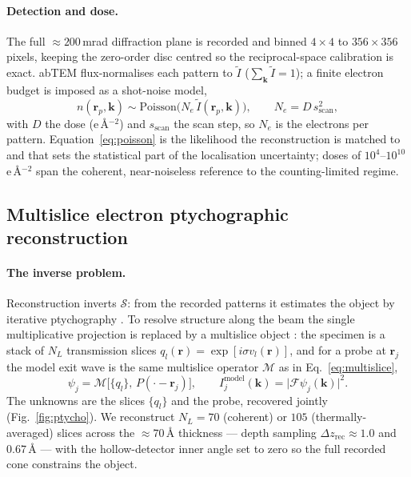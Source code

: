 \paragraph{Detection and dose.}
The full $\approx200$\,mrad diffraction plane is recorded and binned $4\times4$ to
$356\times356$ pixels, keeping the zero-order disc centred so the reciprocal-space calibration
is exact. abTEM flux-normalises each pattern to $\tilde I$ ($\sum_{\mathbf{k}}\tilde I=1$); a
finite electron budget is imposed as a shot-noise model,
\begin{equation}
  n(\mathbf{r}_p,\mathbf{k}) \sim \mathrm{Poisson}\!\big(N_e\,\tilde I(\mathbf{r}_p,\mathbf{k})\big),
  \qquad N_e = D\,s_{\mathrm{scan}}^2,
  \label{eq:poisson}
\end{equation}
with $D$ the dose (e\,\AA$^{-2}$) and $s_{\mathrm{scan}}$ the scan step, so $N_e$ is the
electrons per pattern. Equation~\eqref{eq:poisson} is the likelihood the reconstruction is
matched to and that sets the statistical part of the localisation uncertainty; doses of
$10^{4}$--$10^{10}$\,e\,\AA$^{-2}$ span the coherent, near-noiseless reference to the
counting-limited regime.

\subsection{Multislice electron ptychographic reconstruction}
\label{sec:recon}

\paragraph{The inverse problem.}
Reconstruction inverts $\mathcal{S}$: from the recorded patterns it estimates the object by
iterative ptychography \citep{RodenburgFaulkner2004,Wakonig2020}. To resolve structure along
the beam the single multiplicative projection is replaced by a multislice object
\citep{MaidenHumphryRodenburg2012}: the specimen is a stack of $N_L$ transmission slices
$q_l(\mathbf{r})=\exp[i\sigma v_l(\mathbf{r})]$, and for a probe at $\mathbf{r}_j$ the model
exit wave is the same multislice operator $\mathcal{M}$ as in Eq.~\eqref{eq:multislice},
\begin{equation}
  \psi_j = \mathcal{M}\big[\{q_l\},\,P(\cdot-\mathbf{r}_j)\big],
  \qquad I_j^{\mathrm{model}}(\mathbf{k}) = \big\lvert\mathcal{F}\psi_j(\mathbf{k})\big\rvert^2 .
  \label{eq:ptycho_fwd}
\end{equation}
The unknowns are the slices $\{q_l\}$ and the probe, recovered jointly (Fig.~\ref{fig:ptycho}).
We reconstruct $N_L=70$ (coherent) or $105$ (thermally-averaged) slices across the
$\approx70$\,\AA{} thickness --- depth sampling $\Delta z_\mathrm{rec}\approx1.0$ and
$0.67$\,\AA{} --- with the hollow-detector inner angle set to zero so the full recorded cone
constrains the object.

